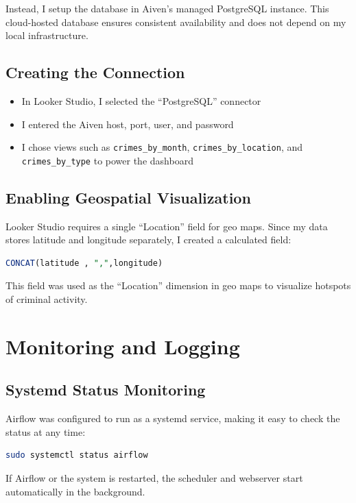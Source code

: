 \documentclass[12pt]{article}
\begin{document}
Instead, I setup the database in Aiven’s managed PostgreSQL instance. This cloud-hosted database ensures consistent availability and does not depend on my local infrastructure.

\subsection*{Creating the Connection}
\begin{itemize}
    \item In Looker Studio, I selected the “PostgreSQL” connector
    \item I entered the Aiven host, port, user, and password 
    \item I chose views such as \texttt{crimes\_by\_month}, \texttt{crimes\_by\_location}, and \texttt{crimes\_by\_type} to power the dashboard
\end{itemize}

\subsection*{Enabling Geospatial Visualization}
Looker Studio requires a single “Location” field for geo maps. Since my data stores latitude and longitude separately, I created a calculated field:

\begin{lstlisting}[language=SQL, caption={Looker Studio calculated field for geo mapping}]
CONCAT(latitude , ",",longitude)
\end{lstlisting}

This field was used as the “Location” dimension in geo maps to visualize hotspots of criminal activity.



\section{Monitoring and Logging}

\subsection*{Systemd Status Monitoring}
Airflow was configured to run as a systemd service, making it easy to check the status at any time:

\begin{lstlisting}[language=bash]
sudo systemctl status airflow
\end{lstlisting}

If Airflow or the system is restarted, the scheduler and webserver start automatically in the background.
\end{document}

